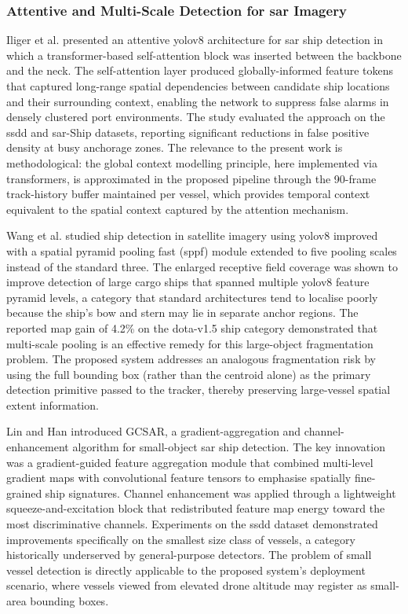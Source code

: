 \subsubsection{\textbf{Attentive and Multi-Scale Detection for \gls{sar} Imagery}}
 
Iliger et al. \cite{Iliger2024} presented an attentive \gls{yolov8} architecture for
\gls{sar} ship detection in which a transformer-based self-attention block was inserted
between the backbone and the neck. The self-attention layer produced
globally-informed feature tokens that captured long-range spatial dependencies
between candidate ship locations and their surrounding context, enabling the
network to suppress false alarms in densely clustered port environments. The
study evaluated the approach on the \gls{ssdd} and \gls{sar}-Ship datasets, reporting
significant reductions in false positive density at busy anchorage zones. The
relevance to the present work is methodological: the global context modelling
principle, here implemented via transformers, is approximated in the proposed
pipeline through the 90-frame track-history buffer maintained per vessel, which
provides temporal context equivalent to the spatial context captured by the
attention mechanism.
 
Wang et al. \cite{Wang2025} studied ship detection in satellite imagery using
\gls{yolov8} improved with a spatial pyramid pooling fast (\gls{sppf}) module extended to
five pooling scales instead of the standard three. The enlarged receptive field
coverage was shown to improve detection of large cargo ships that spanned multiple
\gls{yolov8} feature pyramid levels, a category that standard architectures tend to
localise poorly because the ship's bow and stern may lie in separate anchor
regions. The reported \gls{map} gain of 4.2\% on the \gls{dota}-v1.5 ship category
demonstrated that multi-scale pooling is an effective remedy for this large-object
fragmentation problem. The proposed system addresses an analogous fragmentation
risk by using the full bounding box (rather than the centroid alone) as the
primary detection primitive passed to the tracker, thereby preserving large-vessel
spatial extent information.
 
Lin and Han \cite{Lin2024} introduced GCSAR, a gradient-aggregation and
channel-enhancement algorithm for small-object \gls{sar} ship detection. The key
innovation was a gradient-guided feature aggregation module that combined
multi-level gradient maps with convolutional feature tensors to emphasise
spatially fine-grained ship signatures. Channel enhancement was applied through
a lightweight squeeze-and-excitation block that redistributed feature map energy
toward the most discriminative channels. Experiments on the \gls{ssdd} dataset
demonstrated improvements specifically on the smallest size class of vessels,
a category historically underserved by general-purpose detectors. The problem
of small vessel detection is directly applicable to the proposed system's
deployment scenario, where vessels viewed from elevated drone altitude may
register as small-area bounding boxes.
 
